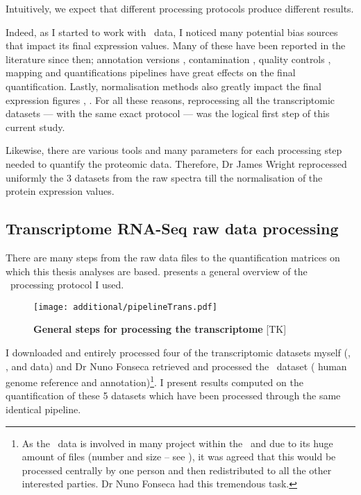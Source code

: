 Intuitively, we expect that different processing protocols produce
different results.

Indeed, as I started to work with \Rnaseq\ data, I noticed many potential bias
sources that impact its final expression values. Many of these have been
reported in the literature since then;
annotation versions ,
contamination ,
quality controls ,
mapping and quantifications pipelines 
have great effects on the final quantification. Lastly, normalisation
methods also greatly impact the final expression figures
, . For all these reasons, reprocessing
all the transcriptomic datasets --- with the same exact protocol ---
was the logical first step of this current study.

Likewise, there are various tools and many parameters for each processing step
needed to quantify the proteomic data. Therefore, Dr James Wright reprocessed
uniformly the 3 datasets from the raw spectra till the normalisation of the
protein expression values.

\subsection{Transcriptome RNA-Seq raw data processing}

There are many steps from the raw data files to the quantification matrices
on which this thesis analyses are based.  presents a
general overview of the \Rnaseq\ processing protocol I used.

\begin{figure}
    \texttt{[image: additional/pipelineTrans.pdf]}\centering
    \caption[General steps for processing the transcriptomic
    data]{\label{fig:pipelineTrans}\textbf{General steps for processing the
    transcriptome} [TK]}
\end{figure}

I downloaded and entirely processed four of the transcriptomic datasets
myself (, ,  and 
data) and Dr Nuno Fonseca retrieved and processed the \Gtex\ dataset (
human genome reference and  annotation)\footnote{As
the \Gtex\ data is involved in many project within the \EBI\
and due to its huge amount of files (number and  size -- see ),
it was agreed that this would be processed centrally by one person and then
redistributed to all the other interested parties. Dr Nuno Fonseca had this
tremendous task.}. I present results computed on the quantification of these
5 datasets which have been processed through the same identical pipeline.


